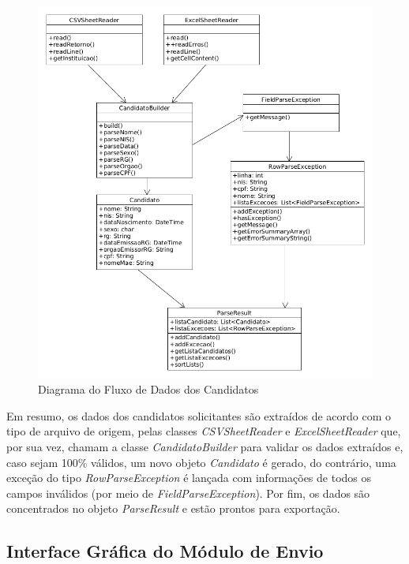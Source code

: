 \documentclass[
	12pt,			%
	openright,		%
	oneside,	
	a4paper,		%
	english,		%
	brazil			%
]{abntex2/abntex2}  %
\begin{document}
	\begin{figure}[H]
		\begin{center}
			
			\caption{Diagrama do Fluxo de Dados dos Candidatos}
			\label{envio-uml}
			
			\includegraphics[scale=0.5]{img/envio-uml}
			
		\end{center}
	\end{figure}
	
	Em resumo, os dados dos candidatos solicitantes são extraídos de acordo com o tipo de arquivo de origem, pelas classes \textit{CSVSheetReader} e \textit{ExcelSheetReader} que, por sua vez, chamam a classe \textit{CandidatoBuilder} para validar os dados extraídos e, caso sejam 100\% válidos, um novo objeto \textit{Candidato} é gerado, do contrário, uma exceção do tipo \textit{RowParseException} é lançada com informações de todos os campos inválidos (por meio de \textit{FieldParseException}). Por fim, os dados são concentrados no objeto \textit{ParseResult} e estão prontos para exportação.
	
	\subsection{Interface Gráfica do Módulo de Envio}
	
\end{document}
